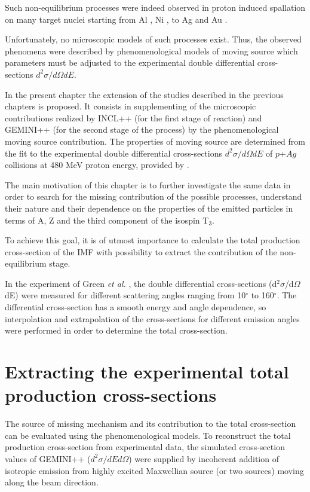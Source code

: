 Such non-equilibrium processes were indeed observed in proton induced spallation on many target nuclei starting from Al  \cite{fidelus2014sequential} , Ni  \cite{budzanowski2009variation}, to Ag  \cite{fidelus2017non} and Au  \cite{budzanowski2010comparison}.  

Unfortunately, no microscopic models of such processes exist. Thus, the observed phenomena were described by phenomenological models of moving source which parameters must be adjusted to the experimental double differential  cross-sections $d^2\sigma/d\Omega dE$.  

In the present chapter the extension of the studies described in the previous chapters is proposed. It consists in supplementing of the microscopic contributions realized by INCL++
(for the first stage of reaction) and GEMINI++ (for the second stage of the process) by the phenomenological moving source contribution.  
The properties of moving source are determined from the fit to the experimental double differential cross-sections $d^2\sigma/d\Omega dE$ of $p$+$Ag$ collisions at 480 MeV proton energy, provided by \cite{Green1984}.  

The main motivation of this chapter is to further investigate the same data in order to search for the missing contribution of the possible processes, understand their nature and their dependence on the properties of the emitted particles in terms of A, Z and the third component of the isospin T$_3$. 

To achieve this goal, it is of utmost importance to calculate the total production cross-section of the IMF with possibility to extract the contribution of the non-equilibrium stage. 

In the experiment of Green \emph{et al.} \cite{Green1984}, the double differential cross-sections (d$^2\sigma$/d$\Omega$dE) were measured for different scattering angles ranging from 10$^{\circ}$ to 160$^{\circ}$. The differential cross-section has a smooth energy and angle dependence, so interpolation and extrapolation of the cross-sections for different emission angles were performed in order to determine the total cross-section.
\section{Extracting the experimental total production cross-sections}\label{totalprod}

 The source of missing mechanism and its contribution to the total cross-section can be evaluated using the phenomenological models. To reconstruct the total production cross-section from experimental data, the simulated cross-section values of GEMINI++  ($d^2\sigma/dEd\Omega$) were supplied by incoherent addition of isotropic emission from highly excited Maxwellian source (or two sources) moving along the beam direction.
 
